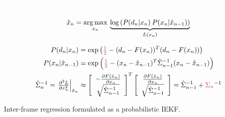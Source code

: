 \begin{algorithm}
\begin{equation*}
\begin{aligned}
{\color{white} x_n^*} &{\color{white}=\argmax_{x_n} \: \log P(d_n|x_n)}
\\
\hat{x}_n &= \argmax_{x_n} \:
\underbrace{\log \left( P(d_n|x_n) \: P(x_n |\hat{x}_{n - 1}) \right)}_{L(x_n)}   
\\
\end{aligned}
\end{equation*}

\begin{equation*}
\begin{aligned}
P(d_n|x_n) &= \exp \left( \todo{\tfrac{1}{2}} - (d_n - F(x_n))^T (d_n - F(x_n)) \right)
\\
P(x_n |\hat{x}_{n - 1}) &= \exp \left( \todo{\tfrac{1}{2}} -(x_n - \hat{x}_{n - 1})^T \hat{\Sigma}_{n - 1}^{-1} (x_n - \hat{x}_{n - 1})\right)
\\
\hat{\Sigma}_n^{-1} = 
\left.\tfrac{\partial^2 L}{\partial x_n^2}\right|_{\hat{x}_n} &\approx 
\left[
	\begin{array}{cc}
		- \tfrac{\partial F(\hat{x}_n)} {\partial x_n} \\
		\sqrt{\hat{\Sigma}_{n - 1}^{-1}} \\
	\end{array}
\right]^T 
\left[
	\begin{array}{c}
		\tfrac{\partial F(\hat{x}_n)} {\partial x_n} \\
		\sqrt{\hat{\Sigma}_{n - 1}^{-1}} \\
	\end{array}
\right] = 
\hat{\Sigma}_{n-1}^{-1}  + \todo{\Sigma_{n}}^{-1}
\end{aligned}
\end{equation*}
\caption{Inter-frame regression formulated as a probabilistic IEKF.}
\label{alg:interframeplus}
\label{alg:iekf-like}
\label{tab:iekf-like}
\end{algorithm}

